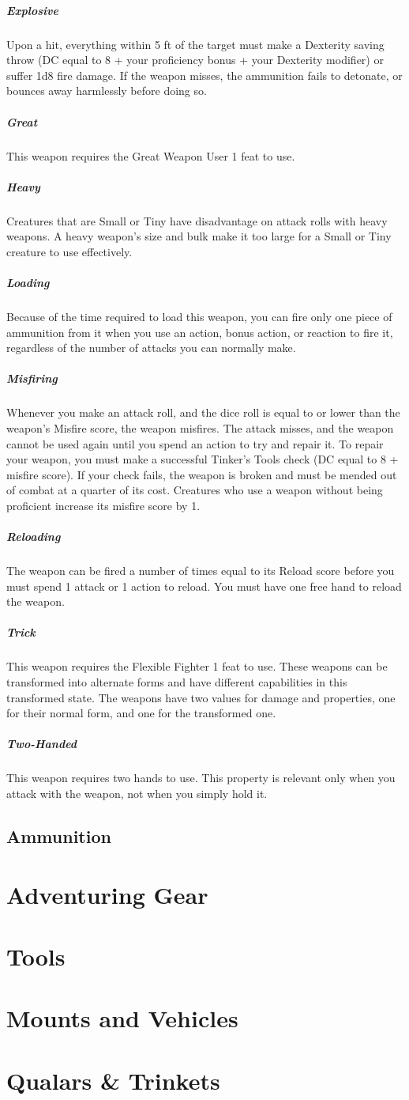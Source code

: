     \subparagraph{Explosive} Upon a hit, everything within 5 ft of the target must make a Dexterity saving throw (DC equal to 8 + your proficiency bonus + your Dexterity modifier) or suffer 1d8 fire damage.
    If the weapon misses, the ammunition fails to detonate, or bounces away harmlessly before doing so.

    \subparagraph{Great} This weapon requires the Great Weapon User 1 feat to use.

    \subparagraph{Heavy} Creatures that are Small or Tiny have disadvantage on attack rolls with heavy weapons.
    A heavy weapon's size and bulk make it too large for a Small or Tiny creature to use effectively.

    \subparagraph{Loading} Because of the time required to load this weapon, you can fire only one piece of ammunition from it when you use an action, bonus action, or reaction to fire it, regardless of the number of attacks you can normally make.

    \subparagraph{Misfiring} Whenever you make an attack roll, and the dice roll is equal to or lower than the weapon’s Misfire score, the weapon misfires.
    The attack misses, and the weapon cannot be used again until you spend an action to try and repair it.
    To repair your weapon, you must make a successful Tinker’s Tools check (DC equal to 8 + misfire score).
    If your check fails, the weapon is broken and must be mended out of combat at a quarter of its cost.
    Creatures who use a weapon without being proficient increase its misfire score by 1.

    \subparagraph{Reloading} The weapon can be fired a number of times equal to its Reload score before you must spend 1 attack or 1 action to reload.
    You must have one free hand to reload the weapon.

    \subparagraph{Trick} This weapon requires the Flexible Fighter 1 feat to use.
    These weapons can be transformed into alternate forms and have different capabilities in this transformed state.
    The weapons have two values for damage and properties, one for their normal form, and one for the transformed one.

    \subparagraph{Two-Handed} This weapon requires two hands to use.
    This property is relevant only when you attack with the weapon, not when you simply hold it.

\subsection*{Ammunition} \label{ssec::ammunition}

\section{Adventuring Gear} \label{sec::adventuring}
\section{Tools} \label{sec::tools}
\section{Mounts and Vehicles} \label{sec::adventuring}
\section{Qualars \& Trinkets} \label{sec::trinkets}
